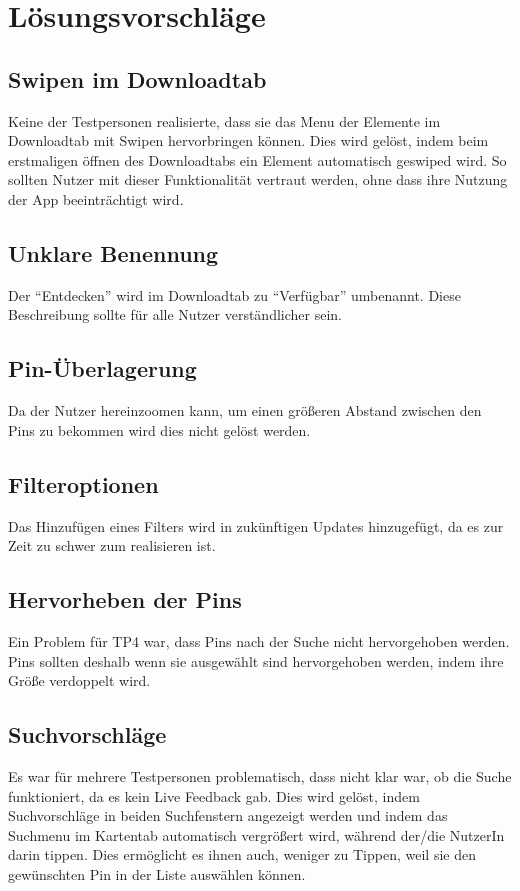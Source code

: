 \section{Lösungsvorschläge}

\subsection{Swipen im Downloadtab}
Keine der Testpersonen realisierte, dass sie das Menu der Elemente im Downloadtab mit Swipen hervorbringen können. Dies wird gelöst, indem beim erstmaligen öffnen des Downloadtabs ein Element automatisch geswiped wird. So sollten Nutzer mit dieser Funktionalität vertraut werden, ohne dass ihre Nutzung der App beeinträchtigt wird.

\subsection{Unklare Benennung}
Der \enquote{Entdecken} wird im Downloadtab zu \enquote{Verfügbar} umbenannt. Diese Beschreibung sollte für alle Nutzer verständlicher sein.

\subsection{Pin-Überlagerung}
Da der Nutzer hereinzoomen kann, um einen größeren Abstand zwischen den Pins zu bekommen wird dies nicht gelöst werden.

\subsection{Filteroptionen}
Das Hinzufügen eines Filters wird in zukünftigen Updates hinzugefügt, da es zur Zeit zu schwer zum realisieren ist.

\subsection{Hervorheben der Pins}
Ein Problem für TP4 war, dass Pins nach der Suche nicht hervorgehoben werden. Pins sollten deshalb wenn sie ausgewählt sind hervorgehoben werden, indem ihre Größe verdoppelt wird.


\subsection{Suchvorschläge}
Es war für mehrere Testpersonen problematisch, dass nicht klar war, ob die Suche funktioniert, da es kein Live Feedback gab. Dies wird gelöst, indem Suchvorschläge in beiden Suchfenstern angezeigt werden und indem das Suchmenu im Kartentab automatisch vergrößert wird, während der/die NutzerIn darin tippen. Dies ermöglicht es ihnen auch, weniger zu Tippen, weil sie den gewünschten Pin in der Liste auswählen können.